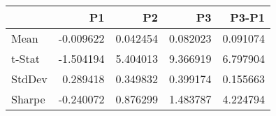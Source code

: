 \begin{tabular}{lrrrr}
\toprule
 & P1 & P2 & P3 & P3-P1 \\
\midrule
Mean & -0.009622 & 0.042454 & 0.082023 & 0.091074 \\
t-Stat & -1.504194 & 5.404013 & 9.366919 & 6.797904 \\
StdDev & 0.289418 & 0.349832 & 0.399174 & 0.155663 \\
Sharpe & -0.240072 & 0.876299 & 1.483787 & 4.224794 \\
\bottomrule
\end{tabular}

